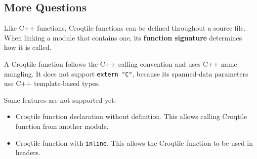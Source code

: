 \subsection*{More Questions}

Like C++ functions, Croqtile functions can be defined throughout a source file. When linking a module that contains one, its \textbf{function signature} determines how it is called.

A Croqtile function follows the C++ calling convention and uses C++ name mangling. It does not support \texttt{extern "C"}, because its spanned-data parameters use C++ template-based types.

Some features are not supported yet:

\begin{itemize}[leftmargin=1.6em]
\item Croqtile function declaration without definition. This allows calling Croqtile function from another module.
\item Croqtile function with \texttt{inline}. This allows the Croqtile function to be used in headers.
\end{itemize}
